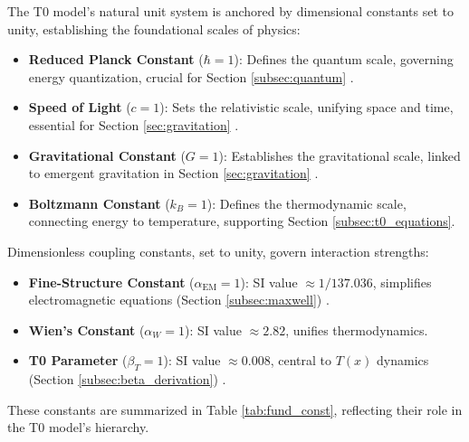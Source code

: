 \documentclass[12pt,a4paper]{article}
\newcommand{\Tfield}{T(x)}
\begin{document}
	The T0 model’s natural unit system is anchored by dimensional constants set to unity, establishing the foundational scales of physics:
	\begin{itemize}
		\item \textbf{Reduced Planck Constant} (\(\hbar = 1\)): Defines the quantum scale, governing energy quantization, crucial for Section \ref{subsec:quantum} \cite{Planck1899}.
		\item \textbf{Speed of Light} (\(c = 1\)): Sets the relativistic scale, unifying space and time, essential for Section \ref{sec:gravitation} \cite{Einstein1905}.
		\item \textbf{Gravitational Constant} (\(G = 1\)): Establishes the gravitational scale, linked to emergent gravitation in Section \ref{sec:gravitation} \cite{Einstein1915}.
		\item \textbf{Boltzmann Constant} (\(k_B = 1\)): Defines the thermodynamic scale, connecting energy to temperature, supporting Section \ref{subsec:t0_equations}.
	\end{itemize}
	
	Dimensionless coupling constants, set to unity, govern interaction strengths:
	\begin{itemize}
		\item \textbf{Fine-Structure Constant} (\(\alpha_{\text{EM}} = 1\)): SI value \(\approx 1/137.036\), simplifies electromagnetic equations (Section \ref{subsec:maxwell}) \cite{pascher_alpha_2025}.
		\item \textbf{Wien’s Constant} (\(\alpha_W = 1\)): SI value \(\approx 2.82\), unifies thermodynamics.
		\item \textbf{T0 Parameter} (\(\beta_T = 1\)): SI value \(\approx 0.008\), central to \(\Tfield\) dynamics (Section \ref{subsec:beta_derivation}) \cite{pascher_beta_2025}.
	\end{itemize}
	
	These constants are summarized in Table \ref{tab:fund_const}, reflecting their role in the T0 model’s hierarchy.
	
\end{document}
